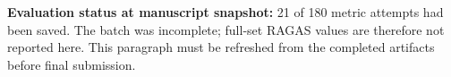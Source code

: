 \textbf{Evaluation status at manuscript snapshot:} 21 of 180 metric attempts had been saved. The batch was incomplete; full-set RAGAS values are therefore not reported here. This paragraph must be refreshed from the completed artifacts before final submission.
